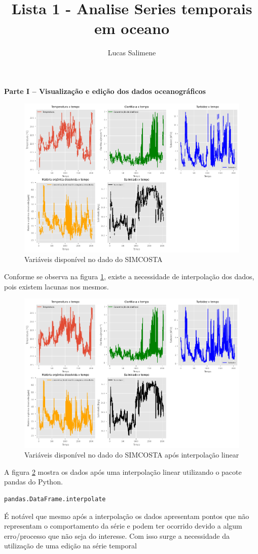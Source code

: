 \documentclass[12pt,a4paper,portuguese]{article}
\title{Lista 1 - Analise Series temporais em oceano}
\author{Lucas Salimene}
\date{}
\begin{document}
	
	\maketitle
	\newpage
	
	\textbf{Parte I – Visualização e edição dos dados oceanográficos}
	
	

\begin{figure}[H]
	\centering
	\includegraphics[width=1\linewidth]{lista1-1b}
	\caption{Variáveis disponível no dado do SIMCOSTA}
	\label{fig:lista1-1b}
\end{figure}
	Conforme se observa na figura \ref{fig:lista1-1b}, existe a necessidade de interpolação dos dados, pois existem lacunas nos mesmos.
	
\begin{figure}[H]
	\centering
	\includegraphics[width=1\linewidth]{lista1-1c}
	\caption{Variáveis disponível no dado do SIMCOSTA após interpolação linear}
	\label{fig:lista1-1c}
\end{figure}
	A figura \ref{fig:lista1-1c} mostra os dados após uma interpolação linear utilizando o pacote pandas do Python.
	\begin{verbatim}
pandas.DataFrame.interpolate
	\end{verbatim}
	É notável que mesmo após a interpolação os dados apresentam pontos que não representam o comportamento da série e podem ter ocorrido devido a algum erro/processo que não seja do interesse. Com isso surge a necessidade da utilização de uma edição na série temporal
	
	
\end{document}
